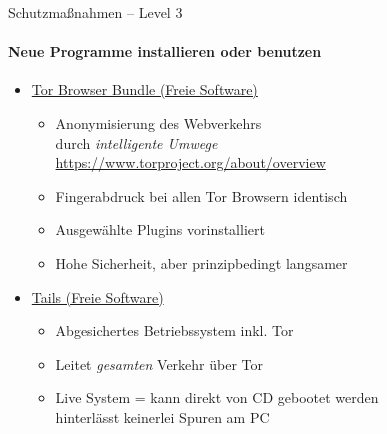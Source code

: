 \begin{frame}{Schutzmaßnahmen -- Level 3}
\framesubtitle{Neue Programme installieren oder benutzen}
  \begin{itemize}
    \item \href{https://www.torproject.org}{Tor Browser Bundle (Freie Software)}
    \begin{itemize}
      \item Anonymisierung des Webverkehrs\\durch \emph{\glqq intelligente Umwege\grqq}\\
        {\small\url{https://www.torproject.org/about/overview}}
      \item Fingerabdruck bei allen Tor Browsern identisch
      \item Ausgewählte Plugins vorinstalliert
      \item Hohe Sicherheit, aber prinzipbedingt langsamer
    \end{itemize}
    \pause
    \item \href{https://tails.boum.org}{Tails (Freie Software)}
    \begin{itemize}
      \item Abgesichertes Betriebssystem inkl. Tor
      \item Leitet \emph{gesamten} Verkehr über Tor
      \item Live System = kann direkt von CD gebootet werden\\ hinterlässt keinerlei Spuren am PC
    \end{itemize}
  \end{itemize}
\end{frame}

\endinput
